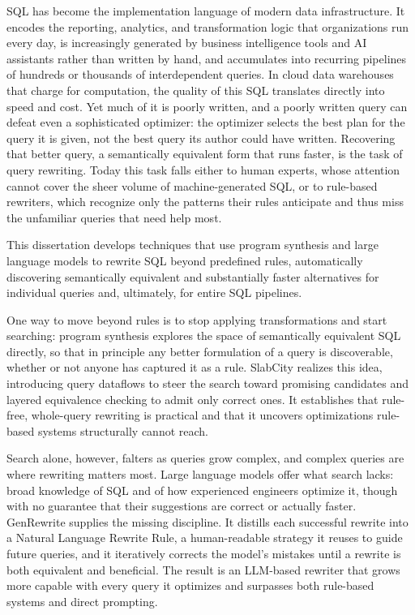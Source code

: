 SQL has become the implementation language of modern data infrastructure. It encodes the reporting, analytics, and transformation logic that organizations run every day, is increasingly generated by business intelligence tools and AI assistants rather than written by hand, and accumulates into recurring pipelines of hundreds or thousands of interdependent queries. In cloud data warehouses that charge for computation, the quality of this SQL translates directly into speed and cost. Yet much of it is poorly written, and a poorly written query can defeat even a sophisticated optimizer: the optimizer selects the best plan for the query it is given, not the best query its author could have written. Recovering that better query, a semantically equivalent form that runs faster, is the task of query rewriting. Today this task falls either to human experts, whose attention cannot cover the sheer volume of machine-generated SQL, or to rule-based rewriters, which recognize only the patterns their rules anticipate and thus miss the unfamiliar queries that need help most.

This dissertation develops techniques that use program synthesis and large language models to rewrite SQL beyond predefined rules, automatically discovering semantically equivalent and substantially faster alternatives for individual queries and, ultimately, for entire SQL pipelines.

One way to move beyond rules is to stop applying transformations and start searching: program synthesis explores the space of semantically equivalent SQL directly, so that in principle any better formulation of a query is discoverable, whether or not anyone has captured it as a rule. SlabCity realizes this idea, introducing query dataflows to steer the search toward promising candidates and layered equivalence checking to admit only correct ones. It establishes that rule-free, whole-query rewriting is practical and that it uncovers optimizations rule-based systems structurally cannot reach.

Search alone, however, falters as queries grow complex, and complex queries are where rewriting matters most. Large language models offer what search lacks: broad knowledge of SQL and of how experienced engineers optimize it, though with no guarantee that their suggestions are correct or actually faster. GenRewrite supplies the missing discipline. It distills each successful rewrite into a Natural Language Rewrite Rule, a human-readable strategy it reuses to guide future queries, and it iteratively corrects the model's mistakes until a rewrite is both equivalent and beneficial. The result is an LLM-based rewriter that grows more capable with every query it optimizes and surpasses both rule-based systems and direct prompting.

